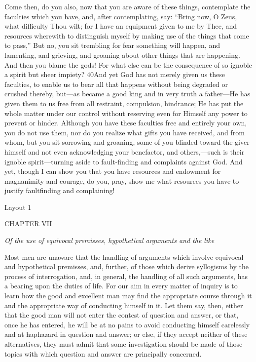 Come then, do you also, now that you are aware of these things, contemplate the faculties which you have, and, after contemplating, say: ``Bring now, O Zeus, what difficulty Thou wilt; for I have an equipment given to me by Thee, and resources wherewith to distinguish myself by making use of the things that come to pass,'' But no, you sit trembling for fear something will happen, and lamenting, and grieving, and groaning about other things that are happening. And then you blame the gods! For what else can be the consequence of so ignoble a spirit but sheer impiety? 40And yet God has not merely given us these faculties, to enable us to bear all that happens without being degraded or crushed thereby, but—as became a good king and in very truth a father—He has given them to us free from all restraint, compulsion, hindrance; He has put the whole matter under our control without reserving even for Himself any power to prevent or hinder. Although you have these faculties free and entirely your own, you do not use them, nor do you realize what gifts you have received, and from whom, but you sit sorrowing and groaning, some of you blinded toward the giver himself and not even acknowledging your benefactor, and others,—such is their ignoble spirit—turning aside to fault-finding and complaints against God. And yet, though I can show you that you have resources and endowment for magnanimity and courage, do you, pray, show me what resources you have to justify faultfinding and complaining!



Layout 1

CHAPTER VII

\emph{Of the use of equivocal premisses, hypothetical arguments and the like}

Most men are unaware that the handling of arguments which involve equivocal and hypothetical premisses, and, further, of those which derive syllogisms by the process of interrogation, and, in general, the handling of all such arguments, has a bearing upon the duties of life. For our aim in every matter of inquiry is to learn how the good and excellent man may find the appropriate course through it and the appropriate way of conducting himself in it. Let them say, then, either that the good man will not enter the contest of question and answer, or that, once he has entered, he will be at no pains to avoid conducting himself carelessly and at haphazard in question and answer; or else, if they accept neither of these alternatives, they must admit that some investigation should be made of those topics with which question and answer are principally concerned.

